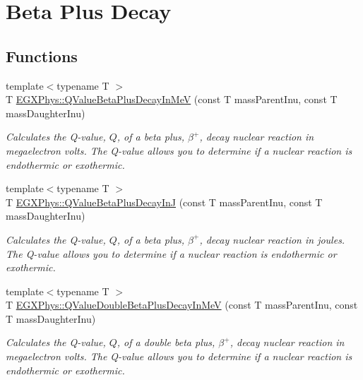 \hypertarget{group___e_g_x_phys-_q_value-_beta_plus}{}\section{Beta Plus Decay}
\label{group___e_g_x_phys-_q_value-_beta_plus}
\subsection*{Functions}
\begin{DoxyCompactItemize}
\item 
{\footnotesize template$<$typename T $>$ }\\T \mbox{\hyperlink{group___e_g_x_phys-_q_value-_beta_plus_ga3c4f7ec8e7c44d01d3aee6447a5ab443}{E\+G\+X\+Phys\+::\+Q\+Value\+Beta\+Plus\+Decay\+In\+MeV}} (const T mass\+Parent\+Inu, const T mass\+Daughter\+Inu)
\begin{DoxyCompactList}\small\item\em Calculates the Q-\/value, $Q$, of a beta plus, $\beta^+$, decay nuclear reaction in megaelectron volts. The Q-\/value allows you to determine if a nuclear reaction is endothermic or exothermic. \end{DoxyCompactList}\item 
{\footnotesize template$<$typename T $>$ }\\T \mbox{\hyperlink{group___e_g_x_phys-_q_value-_beta_plus_gaaee51753f077c9fe05188aa5b24f642e}{E\+G\+X\+Phys\+::\+Q\+Value\+Beta\+Plus\+Decay\+InJ}} (const T mass\+Parent\+Inu, const T mass\+Daughter\+Inu)
\begin{DoxyCompactList}\small\item\em Calculates the Q-\/value, $Q$, of a beta plus, $\beta^+$, decay nuclear reaction in joules. The Q-\/value allows you to determine if a nuclear reaction is endothermic or exothermic. \end{DoxyCompactList}\item 
{\footnotesize template$<$typename T $>$ }\\T \mbox{\hyperlink{group___e_g_x_phys-_q_value-_beta_plus_gab78be314eac63ddbce441b4c8b22b47d}{E\+G\+X\+Phys\+::\+Q\+Value\+Double\+Beta\+Plus\+Decay\+In\+MeV}} (const T mass\+Parent\+Inu, const T mass\+Daughter\+Inu)
\begin{DoxyCompactList}\small\item\em Calculates the Q-\/value, $Q$, of a double beta plus, $\beta^+$, decay nuclear reaction in megaelectron volts. The Q-\/value allows you to determine if a nuclear reaction is endothermic or exothermic. \end{DoxyCompactList}\item 

\end{DoxyCompactItemize}
